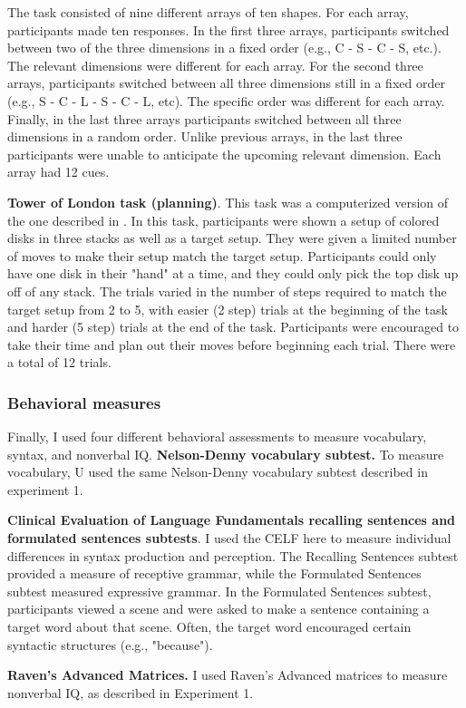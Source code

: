 \documentclass[../dissertation.tex]{subfiles}
\begin{document}
The task consisted of nine different arrays of ten shapes. For each array, participants made ten responses. In the first three arrays, participants switched between two of the three dimensions in a fixed order (e.g., C - S - C - S, etc.). The relevant dimensions were different for each array. For the second three arrays, participants switched between all three dimensions still in a fixed order (e.g., S - C - L - S - C - L, etc). The specific order was different for each array. Finally, in the last three arrays participants switched between all three dimensions in a random order. Unlike previous arrays, in the last three participants were unable to anticipate the upcoming relevant dimension. Each array had 12 cues. \par
\textbf{Tower of London task (planning)}. This task was a computerized version of the one described in \citet{Shallice1982}. In this task, participants were shown a setup of colored disks in three stacks as well as a target setup. They were given a limited number of moves to make their setup match the target setup. Participants could only have one disk in their "hand" at a time, and they could only pick the top disk up off of any stack. The trials varied in the number of steps required to match the target setup from 2 to 5, with easier (2 step) trials at the beginning of the task and harder (5 step) trials at the end of the task. Participants were encouraged to take their time and plan out their moves before beginning each trial. There were a total of 12 trials.

\subsubsection{Behavioral measures} 
Finally, I used four different behavioral assessments to measure vocabulary, syntax, and nonverbal IQ.
\textbf{Nelson-Denny vocabulary subtest.} To measure vocabulary, U used the same Nelson-Denny vocabulary subtest described in experiment 1. \par
\textbf{Clinical Evaluation of Language Fundamentals recalling sentences and formulated sentences subtests}. I used the CELF here to measure individual differences in syntax production and perception. The Recalling Sentences subtest provided a measure of receptive grammar, while the Formulated Sentences subtest measured expressive grammar. In the Formulated Sentences subtest, participants viewed a scene and were asked to make a sentence containing a target word about that scene. Often, the target word encouraged certain syntactic structures (e.g., "because"). \par
\textbf{Raven's Advanced Matrices.} I used Raven's Advanced matrices to measure nonverbal IQ, as described in Experiment 1.
\end{document}
